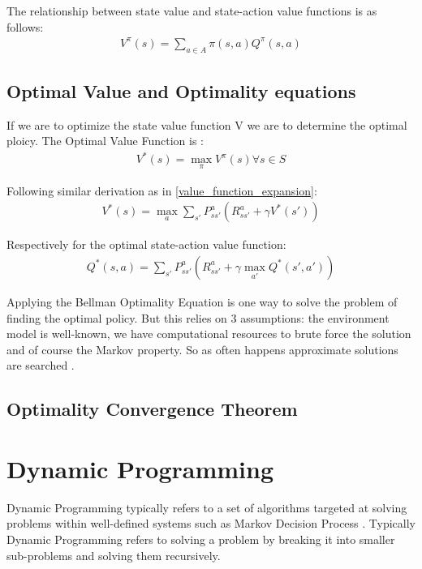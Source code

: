 The relationship between state value and state-action value functions is as follows:
\begin{align}
    V^{\pi}(s) = \sum_{a \in A} \pi(s, a) Q^{\pi}(s, a) 
\end{align}

\subsection{Optimal Value and Optimality equations}
If we are to optimize the state value function V we are to determine the optimal ploicy. The Optimal Value Function is \cite{lecture_mdp}:
\begin{align}
    V^*(s) = \max_{\pi} V^{\pi}(s)   \forall s \in S
\end{align}

Following similar derivation as in \ref{value_function_expansion}:
\begin{align}
    V^*(s) = \max_{a}\sum_{s'} P^{a}_{ss'} (R^{a}_{ss'} + \gamma V^{*}(s'))
\end{align}

Respectively for the optimal state-action value function:
\begin{align}
    Q^*(s, a) = \sum_{s'} P^{a}_{ss'} (R^{a}_{ss'} + \gamma \max_{a'}Q^{*}(s', a'))
\end{align}

Applying the Bellman Optimality Equation is one way to solve the problem of finding the optimal policy. But this relies on 3 assumptions: the environment model is well-known, we have computational resources to brute force the solution and of course the Markov property. So as often happens approximate solutions are searched \cite{lecture_mdp}.

\subsection{Optimality Convergence Theorem}

\section{Dynamic Programming}
Dynamic Programming typically refers to a set of algorithms targeted at solving problems within well-defined systems such as Markov Decision Process \cite{lecture_dp}. Typically Dynamic Programming refers to solving a problem by breaking it into smaller sub-problems and solving them recursively.

